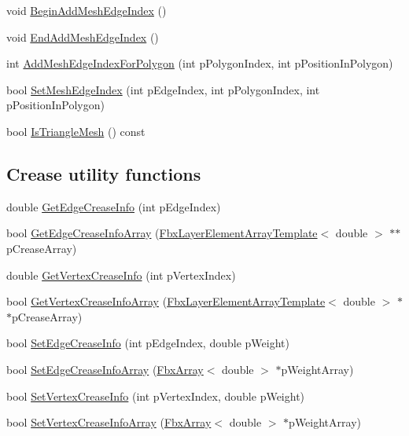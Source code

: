 \begin{DoxyCompactItemize}
\item 
void \hyperlink{class_fbx_mesh_ae2f6092e07e43deff8ac6764ba4a3fdd}{Begin\+Add\+Mesh\+Edge\+Index} ()
\item 
void \hyperlink{class_fbx_mesh_a933636875bbe11e0a214644d96194079}{End\+Add\+Mesh\+Edge\+Index} ()
\item 
int \hyperlink{class_fbx_mesh_a59aca5c258a089ef46db51016ccd0621}{Add\+Mesh\+Edge\+Index\+For\+Polygon} (int p\+Polygon\+Index, int p\+Position\+In\+Polygon)
\item 
bool \hyperlink{class_fbx_mesh_aac8b592569f7454ea4a4881e3ce40fed}{Set\+Mesh\+Edge\+Index} (int p\+Edge\+Index, int p\+Polygon\+Index, int p\+Position\+In\+Polygon)
\item 
bool \hyperlink{class_fbx_mesh_ac361286e901ffa6a3e651bf8ba71be26}{Is\+Triangle\+Mesh} () const
\end{DoxyCompactItemize}
\subsection*{Crease utility functions}
\begin{DoxyCompactItemize}
\item 
double \hyperlink{class_fbx_mesh_aef4f5b60a40bb28395bc784be6ec1f63}{Get\+Edge\+Crease\+Info} (int p\+Edge\+Index)
\item 
bool \hyperlink{class_fbx_mesh_a5d234684ab39de2e06af7a79a1f7721d}{Get\+Edge\+Crease\+Info\+Array} (\hyperlink{class_fbx_layer_element_array_template}{Fbx\+Layer\+Element\+Array\+Template}$<$ double $>$ $\ast$$\ast$p\+Crease\+Array)
\item 
double \hyperlink{class_fbx_mesh_a9c74158d50e75f30e82715fde2eca434}{Get\+Vertex\+Crease\+Info} (int p\+Vertex\+Index)
\item 
bool \hyperlink{class_fbx_mesh_a4c62415bddc677a16c9794189b23eeba}{Get\+Vertex\+Crease\+Info\+Array} (\hyperlink{class_fbx_layer_element_array_template}{Fbx\+Layer\+Element\+Array\+Template}$<$ double $>$ $\ast$$\ast$p\+Crease\+Array)
\item 
bool \hyperlink{class_fbx_mesh_a78f36e935449e10bf16da30f0657d5d5}{Set\+Edge\+Crease\+Info} (int p\+Edge\+Index, double p\+Weight)
\item 
bool \hyperlink{class_fbx_mesh_a7b6ac7bf75d56cfce591c516c2635936}{Set\+Edge\+Crease\+Info\+Array} (\hyperlink{class_fbx_array}{Fbx\+Array}$<$ double $>$ $\ast$p\+Weight\+Array)
\item 
bool \hyperlink{class_fbx_mesh_aa715baf272e681060762171c9647c543}{Set\+Vertex\+Crease\+Info} (int p\+Vertex\+Index, double p\+Weight)
\item 
bool \hyperlink{class_fbx_mesh_aef55378b9360b005b736c5e67d19041e}{Set\+Vertex\+Crease\+Info\+Array} (\hyperlink{class_fbx_array}{Fbx\+Array}$<$ double $>$ $\ast$p\+Weight\+Array)
\end{DoxyCompactItemize}
